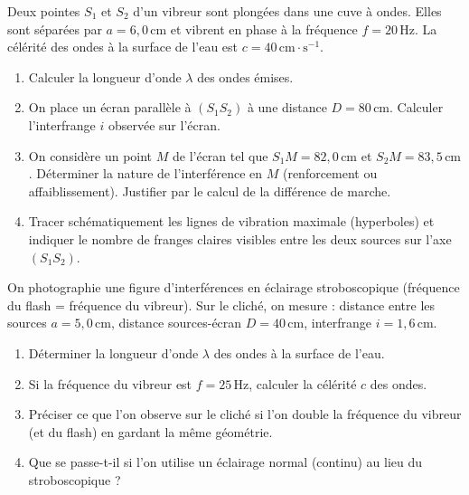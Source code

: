 \documentclass[11pt]{article}
\newcounter{popsec}
\newcounter{popsub}
\newcommand{\courssub}[1]{%
  \stepcounter{popsub}%
  \par\vspace{9pt}\noindent{\popxbold\fontsize{11.5}{13}\selectfont\color{popink}{\color{poporange}\thepopsec.\thepopsub}\hspace{6pt}#1}\par\nopagebreak\vspace{4pt}
}
\begin{document}
\courssub{Je m'entraîne}

\begin{exercice}
Deux pointes $S_1$ et $S_2$ d'un vibreur sont plongées dans une cuve à ondes. Elles sont séparées par $a = 6,0\,\text{cm}$ et vibrent en phase à la fréquence $f = 20\,\text{Hz}$. La célérité des ondes à la surface de l'eau est $c = 40\,\text{cm}\cdot\text{s}^{-1}$.
\begin{enumerate}
    \item Calculer la longueur d'onde $\lambda$ des ondes émises.
    \item On place un écran parallèle à $(S_1S_2)$ à une distance $D = 80\,\text{cm}$. Calculer l'interfrange $i$ observée sur l'écran.
    \item On considère un point $M$ de l'écran tel que $S_1M = 82,0\,\text{cm}$ et $S_2M = 83,5\,\text{cm}$. Déterminer la nature de l'interférence en $M$ (renforcement ou affaiblissement). Justifier par le calcul de la différence de marche.
    \item Tracer schématiquement les lignes de vibration maximale (hyperboles) et indiquer le nombre de franges claires visibles entre les deux sources sur l'axe $(S_1S_2)$.
\end{enumerate}
\end{exercice}

\begin{exercice}
On photographie une figure d'interférences en éclairage stroboscopique (fréquence du flash = fréquence du vibreur). Sur le cliché, on mesure : distance entre les sources $a = 5,0\,\text{cm}$, distance sources-écran $D = 40\,\text{cm}$, interfrange $i = 1,6\,\text{cm}$.
\begin{enumerate}
    \item Déterminer la longueur d'onde $\lambda$ des ondes à la surface de l'eau.
    \item Si la fréquence du vibreur est $f = 25\,\text{Hz}$, calculer la célérité $c$ des ondes.
    \item Préciser ce que l'on observe sur le cliché si l'on double la fréquence du vibreur (et du flash) en gardant la même géométrie.
    \item Que se passe-t-il si l'on utilise un éclairage normal (continu) au lieu du stroboscopique ?
\end{enumerate}
\end{exercice}
\end{document}
